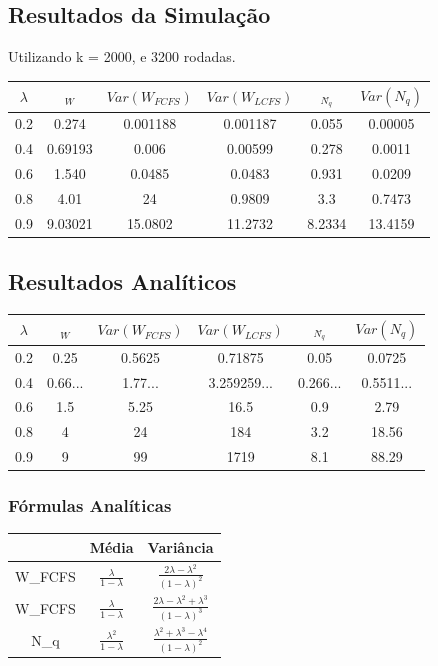 \documentclass{article}
\newcommand*\barra[2][]{\overline{ #1_{#2} }}
\begin{document}
\subsection{Resultados da Simulação}
Utilizando k = 2000, e 3200 rodadas.
\begin{center}
\begin{tabular}{||c c c c c c||} 
 \hline
  $\lambda$ & $\barra{W}$ & $Var(W_{FCFS})$ & $Var(W_{LCFS})$ & $\barra{N_q}$ & $Var(N_{q})$ \\ [0.5ex] 
 \hline
0.2 & 0.274 & 0.001188 & 0.001187 & 0.055 & 0.00005 \\
0.4 & 0.69193 & 0.006 & 0.00599 & 0.278 & 0.0011 \\
0.6 & 1.540 & 0.0485 & 0.0483 & 0.931 & 0.0209 \\
0.8 & 4.01 & 24 & 0.9809 & 3.3 & 0.7473 \\
0.9 & 9.03021 & 15.0802 & 11.2732 & 8.2334 & 13.4159 \\
 \hline
\end{tabular}
\end{center}

\subsection{Resultados Analíticos}
\begin{center}
\begin{tabular}{||c c c c c c||} 
 \hline
  $\lambda$ & $\barra{W}$ & $Var(W_{FCFS})$ & $Var(W_{LCFS})$ & $\barra{N_q}$ & $Var(N_{q})$ \\ [0.5ex] 
 \hline
0.2 & 0.25 & 0.5625 & 0.71875 & 0.05 & 0.0725 \\
0.4 & 0.66... & 1.77... & 3.259259... & 0.266... & 0.5511... \\
0.6 & 1.5 & 5.25 & 16.5 & 0.9 & 2.79 \\
0.8 & 4 & 24 & 184 & 3.2 & 18.56 \\
0.9 & 9 & 99 & 1719 & 8.1 & 88.29 \\
 \hline
\end{tabular}
\end{center}

\subsubsection{Fórmulas Analíticas}
\begin{center}
\begin{tabular}{||c c c||} 
 \hline
  & Média & Variância  \\ [0.5ex] 
 \hline
 W_{FCFS} & $\frac{\lambda}{1-\lambda}$ & $\frac{2\lambda-\lambda^2}{(1-\lambda)^2}$  \\ [2ex] 
 W_{FCFS} & $\frac{\lambda}{1-\lambda}$ & $\frac{2\lambda-\lambda^2+\lambda^3}{(1-\lambda)^3}$  \\ [2ex] 
 N_q & $\frac{\lambda^2}{1-\lambda}$ & $\frac{\lambda^2+\lambda^3-\lambda^4}{(1-\lambda)^2}$  \\ [2ex] 
 \hline
\end{tabular}
\end{center}
\end{document}
